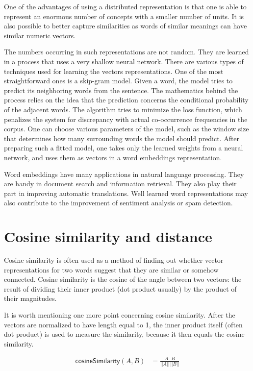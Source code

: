 \documentclass[12pt,]{book}
\begin{document}
One of the advantages of using a distributed representation is that one
is able to represent an enormous number of concepts with a smaller
number of units. It is also possible to better capture similarities as
words of similar meanings can have similar numeric vectors.

The numbers occurring in such representations are not random. They are
learned in a process that uses a very shallow neural network. There are
various types of techniques used for learning the vectors
representations. One of the most straightforward ones is a skip-gram
model. Given a word, the model tries to predict its neighboring words
from the sentence. The mathematics behind the process relies on the idea
that the prediction concerns the conditional probability of the adjacent
words. The algorithm tries to minimize the loss function, which
penalizes the system for discrepancy with actual co-occurrence
frequencies in the corpus. One can choose various parameters of the
model, such as the window size that determines how many surrounding
words the model should predict. After preparing such a fitted model, one
takes only the learned weights from a neural network, and uses them as
vectors in a word embeddings representation.

Word embeddings have many applications in natural language processing.
They are handy in document search and information retrieval. They also
play their part in improving automatic translations. Well learned word
representations may also contribute to the improvement of sentiment
analysis or spam detection.

\section{Cosine similarity and
distance}\label{cosine-similarity-and-distance}

Cosine similarity is often used as a method of finding out whether
vector representations for two words suggest that they are similar or
somehow connected. Cosine similarity is the cosine of the angle between
two vectors: the result of dividing their inner product (dot product
usually) by the product of their magnitudes.

It is worth mentioning one more point concerning cosine similarity.
After the vectors are normalized to have length equal to 1, the inner
product itself (often dot product) is used to measure the similarity,
because it then equals the cosine similarity.

\begin{align} \tag{Sim}
\mathsf{cosineSimilarity}(A,B) & = \frac{A \cdot B}{\vert \vert A \vert \vert \,\vert \vert B \vert \vert}
\end{align}
\end{document}
